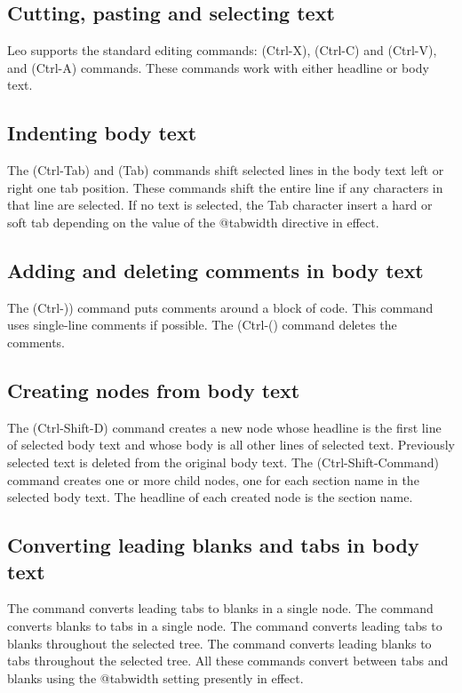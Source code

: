 \documentclass[a4paper,10pt,english]{sphinxmanual}
\begin{document}
\subsection{Cutting, pasting and selecting text}
\label{commands:cutting-pasting-and-selecting-text}
Leo supports the standard editing commands:  (Ctrl-X),
 (Ctrl-C) and  (Ctrl-V), and 
(Ctrl-A) commands. These commands work with either headline or body text.


\subsection{Indenting body text}
\label{commands:indenting-body-text}
The  (Ctrl-Tab) and  (Tab) commands
shift selected lines in the body text left or right one tab position. These
commands shift the entire line if any characters in that line are selected.
If no text is selected, the Tab character insert a hard or soft tab
depending on the value of the @tabwidth directive in effect.


\subsection{Adding and deleting comments in body text}
\label{commands:adding-and-deleting-comments-in-body-text}
The  (Ctrl-)) command puts comments around a block of code.
This command uses single-line comments if possible. The 
(Ctrl-() command deletes the comments.


\subsection{Creating nodes from body text}
\label{commands:creating-nodes-from-body-text}
The  (Ctrl-Shift-D) command creates a new node whose headline is
the first line of selected body text and whose body is all other lines of
selected text. Previously selected text is deleted from the original body
text. The  (Ctrl-Shift-Command) command creates one or
more child nodes, one for each section name in the selected body text. The
headline of each created node is the section name.


\subsection{Converting leading blanks and tabs in body text}
\label{commands:converting-leading-blanks-and-tabs-in-body-text}
The  command converts leading tabs to blanks in a single
node. The  command converts blanks to tabs in a single
node. The  command converts leading tabs to blanks
throughout the selected tree. The  command converts
leading blanks to tabs throughout the selected tree. All these commands
convert between tabs and blanks using the @tabwidth setting presently in
effect.
\end{document}
